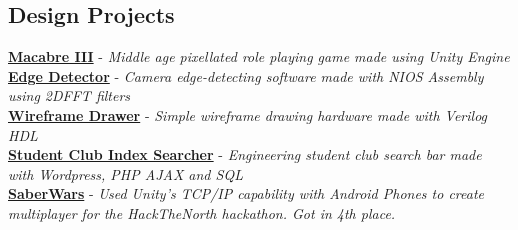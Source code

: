 \documentclass[10pt, a4paper]{cv}
\begin{document}
\subsection*{Design Projects}
\noindent
{}\textbf{\href{http://vuwij.com/index.php/macabre}{Macabre III}} - \emph{Middle age pixellated role playing game made using Unity Engine}\\
\textbf{\href{https://github.com/lpahlavi/EdgeDetector}{Edge Detector}} - \emph{Camera edge-detecting software made with NIOS Assembly using 2DFFT filters}\\
\textbf{\href{http://vuwij.com/index.php/projects1/80-programming-projects/93-3d-hardware-wireframe-renderer}{Wireframe Drawer}} - \emph{Simple wireframe drawing hardware made with Verilog HDL}\\
\textbf{\href{http://skule.ca/view-clubs/}{Student Club Index Searcher}} - \emph{Engineering student club search bar made with Wordpress, PHP AJAX and SQL}\\
\textbf{\href{https://github.com/Abhiseshan/saberwars}{SaberWars}} - \emph{Used Unity's TCP/IP capability with Android Phones to create multiplayer for the HackTheNorth hackathon. Got in 4th place.}
\end{document}
